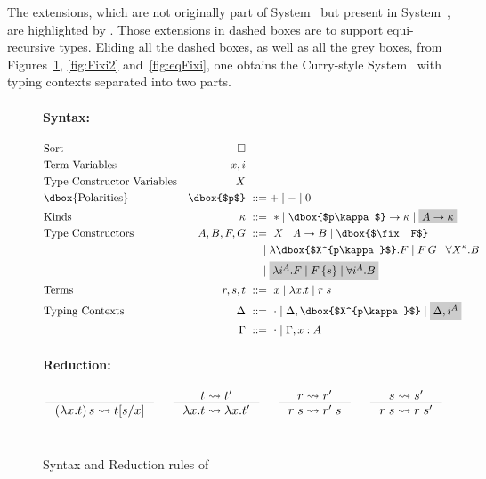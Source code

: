 The extensions, which are not originally part of System \Fw\ but
present in System~\Fixw, are highlighted by .
Those extensions in dashed boxes are to support equi-recursive types. 
Eliding all the dashed boxes, as well as all the grey boxes,
from Figures~\ref{fig:Fixi}, \ref{fig:Fixi2} and~\ref{fig:eqFixi}, one obtains
the Curry-style System \Fw\ with typing contexts separated into two parts.


\begin{figure}\begin{singlespace}
	\small
\paragraph{Syntax:}
\begin{align*}
\!\!\!\!\!\!\!\!&\text{Sort}
 	& \square
	\\
\!\!\!\!\!\!\!\!&\text{Term Variables}
 	& x,i
\\
\!\!\!\!\!\!\!\!&\text{Type Constructor Variables}
 	& X
\\
\!\!\!\!\!\!\!\!&\text{\dbox{Polarities}}
	& \dbox{$p$} &~ ::= + \mid - \mid 0
\\
\!\!\!\!\!\!\!\!&\text{Kinds}
 	& \kappa		&~ ::= ~ *
				\mid \dbox{$p\kappa$} -> \kappa
				\mid \newFi{A -> \kappa}
\\
\!\!\!\!\!\!\!\!&\text{Type Constructors}
	& A,B,F,G		&~ ::= ~ X
				\mid A -> B
				\mid \dbox{$\fix F$} \\ &&& ~\quad
				\mid \lambda \dbox{$X^{p\kappa}$}.F
				\mid F\,G
				\mid \forall X^\kappa . B \\ &&& ~\quad
				\mid \newFi{\lambda i^A.F
				\mid F\,\{s\}
				\mid \forall i^A . B}
\\
\!\!\!\!\!\!\!\!&\text{Terms}
	& r,s,t			&~ ::= ~ x \mid \lambda x.t \mid r\;s
\\
\!\!\!\!\!\!\!\!&\text{Typing Contexts}
	& \Delta		&~ ::= ~ \cdot
				\mid \Delta,\dbox{$X^{p\kappa}$}
				\mid \newFi{\Delta, i^A} \\
&	& \Gamma		&~ ::= ~ \cdot
				\mid \Gamma, x : A
\end{align*}
\paragraph{Reduction:} 
\[ 
   \inference{}{(\lambda x.t)\,s \rightsquigarrow t[s/x]}
 ~~~~
   \inference{t \rightsquigarrow t'}{\lambda x.t \rightsquigarrow \lambda x.t'}
 ~~~~
   \inference{r \rightsquigarrow r'}{r\;s \rightsquigarrow r'\;s}
 ~~~~
   \inference{s \rightsquigarrow s'}{r\;s \rightsquigarrow r\;s'}
\]
~\\
\end{singlespace}
\caption{Syntax and Reduction rules of \Fixi}
\label{fig:Fixi}
\end{figure}

